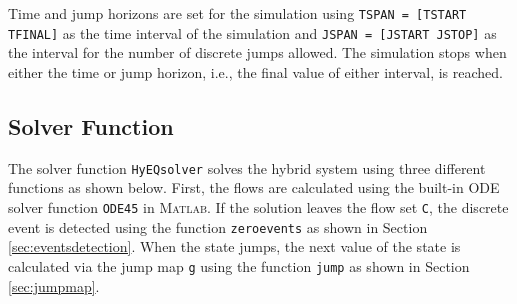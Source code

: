 \documentclass{article}
\newcommand{\matlab}{\textsc{Matlab}}
\newcommand{\ricardo}[1]{{\color{blue} #1}}
\begin{document}
Time and jump horizons are set for the simulation using {\tt TSPAN = [TSTART TFINAL]} 
as the time interval of the simulation and {\tt JSPAN = [JSTART JSTOP]} 
as the interval for the number of discrete jumps allowed. 
The simulation stops when either the time or jump horizon, 
i.e., the final value of either interval, 
is reached.



\subsection{Solver Function}


The solver function {\tt HyEQsolver} solves the hybrid system using 
three different functions as shown below. 
First, the flows are calculated using the built-in ODE solver function {\tt ODE45} in \matlab{}. 
If the solution leaves the flow set {\tt C}, the discrete event is detected using 
the function {\tt zeroevents} as shown in Section \ref{sec:eventsdetection}. When the state jumps, 
the next value of the state is calculated via the jump map {\tt g} using the function {\tt jump} 
as shown in Section \ref{sec:jumpmap}.\\






\end{document}

